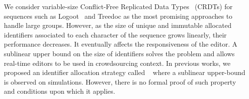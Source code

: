 We consider variable-size Conflict-Free Replicated Data
Types~\cite{shapiro2011comprehensive} (CRDTs) for sequences such as
Logoot~\cite{weiss2010logootundo} and Treedoc as the most promising
approaches to handle large groups. However, as the size of unique and
immutable allocated identifiers associated to each character of the
sequence grows linearly, their performance decreases. It eventually
affects the responsiveness of the editor. A sublinear upper bound on
the size of identifiers solves the problem and allows real-time
editors to be used in crowdsourcing context.  In previous works, we
proposed an identifier allocation strategy called
\LSEQ~\cite{nedelec2013concurrency, nedelec2013lseq} where a sublinear
upper-bound is observed on simulations. However, there is no formal
proof of such property and  conditions upon which it applies.




